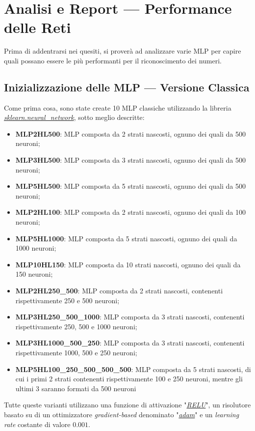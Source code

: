 \documentclass[12pt, a4paper]{article}
\begin{document}
\newpage
\section{Analisi e Report --- Performance delle Reti}
Prima di addentrarsi nei quesiti, si proverà ad analizzare varie MLP per capire quali possano essere le più performanti per il riconoscimento dei numeri.\\
\subsection{Inizializzazione delle MLP --- Versione Classica}
Come prima cosa, sono state create 10 MLP classiche utilizzando la libreria \href{https://scikit-learn.org/stable/modules/generated/sklearn.neural_network.MLPClassifier.html#sklearn.neural_network.MLPClassifier}{\textit{sklearn.neural\_network}}, sotto meglio descritte:
\begin{itemize}
    \item \textbf{MLP2HL500}: MLP composta da 2 strati nascosti, ognuno dei quali da 500 neuroni;
    \item \textbf{MLP3HL500}: MLP composta da 3 strati nascosti, ognuno dei quali da 500 neuroni;
    \item \textbf{MLP5HL500}: MLP composta da 5 strati nascosti, ognuno dei quali da 500 neuroni;
    \item \textbf{MLP2HL100}: MLP composta da 2 strati nascosti, ognuno dei quali da 100 neuroni;
    \item \textbf{MLP5HL1000}: MLP composta da 5 strati nascosti, ognuno dei quali da 1000 neuroni;
    \item \textbf{MLP10HL150}: MLP composta da 10 strati nascosti, ognuno dei quali da 150 neuroni; 
    \item \textbf{MLP2HL250\_500}: MLP composta da 2 strati nascosti, contenenti rispettivamente 250 e 500 neuroni; 
    \item \textbf{MLP3HL250\_500\_1000}: MLP composta da 3 strati nascosti, contenenti rispettivamente 250, 500 e 1000 neuroni; 
    \item \textbf{MLP3HL1000\_500\_250}: MLP composta da 3 strati nascosti, contenenti rispettivamente 1000, 500 e 250 neuroni; 
    \item \textbf{MLP5HL100\_250\_500\_500\_500}: MLP composta da 5 strati nascosti, di cui i primi 2 strati contenenti rispettivamente 100 e 250 neuroni, mentre gli ultimi 3 saranno formati da 500 neuroni 
\end{itemize}
Tutte queste varianti utilizzano una funzione di attivazione "\href{https://it.wikipedia.org/wiki/Rettificatore_(reti_neurali)}{\textit{RELU}}", un risolutore basato su di un ottimizzatore \textit{gradient-based} denominato "\href{https://arxiv.org/abs/1412.6980}{\textit{adam}}" e un \textit{learning rate} costante di valore \(0.001\). \\
\end{document}
